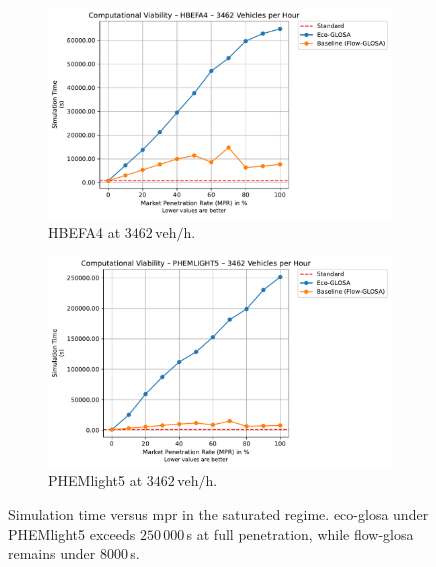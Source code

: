 \begin{figure}[htb]
  \centering
  \begin{subfigure}[b]{0.45\textwidth}
    \includegraphics[width=\textwidth]{data/img/ComputationalViability/ComputationalViability_HBEFA4_Cars3462.pdf}
    \caption{HBEFA4 at $3462\,\mathrm{veh/h}$.}
    \label{fig:Comp_3462_HBEFA4}
  \end{subfigure}\hfill
  \begin{subfigure}[b]{0.45\textwidth}
    \includegraphics[width=\textwidth]{data/img/ComputationalViability/ComputationalViability_PHEMLIGHT5_Cars3462.pdf}
    \caption{PHEMlight5 at $3462\,\mathrm{veh/h}$.}
    \label{fig:Comp_3462_PHEM}
  \end{subfigure}
  \caption{Simulation time versus \ac{mpr} in the saturated regime.  \ac{eco-glosa} under PHEMlight5 exceeds $250\,000\,$s at full penetration, while \ac{flow-glosa} remains under $8000\,$s.}
  \label{fig:Comp_3462}
\end{figure}

